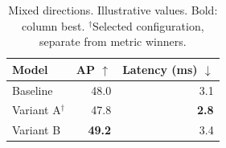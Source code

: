 \begin{table}[!htbp]
\centering\small
\begin{tabular}{lrr}
\toprule
Model & AP $\uparrow$ & Latency (ms) $\downarrow$ \\
\midrule
Baseline & 48.0 & 3.1 \\
\midrule
Variant A$^{\dagger}$ & 47.8 & \textbf{2.8} \\
Variant B & \textbf{49.2} & 3.4 \\
\bottomrule
\end{tabular}
\caption{Mixed directions. Illustrative values. Bold: column best.
$^{\dagger}$Selected configuration, separate from metric winners.}
\label{tab:mixed-metrics}
\end{table}
